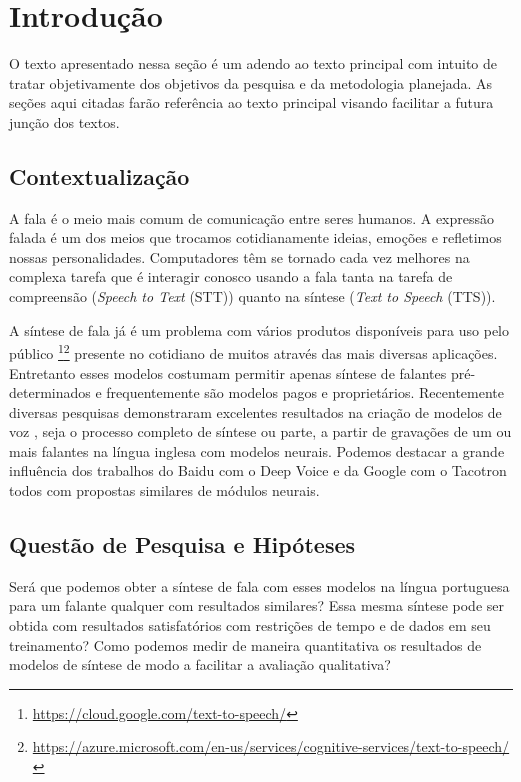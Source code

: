 \documentclass{article}
\begin{document}
\section{Introdução}
O texto apresentado nessa seção é um adendo ao texto principal com intuito de tratar objetivamente dos objetivos da pesquisa e da metodologia planejada. As seções aqui citadas farão referência ao texto principal visando facilitar a futura junção dos textos.
\subsection{Contextualização}
A fala é o meio mais comum de comunicação entre seres humanos\cite{flanang}. 
A expressão falada é um dos meios que trocamos cotidianamente ideias, emoções e refletimos nossas personalidades\cite{Tiwari2012}. 
Computadores têm se tornado cada vez melhores na complexa tarefa que é interagir conosco usando a fala \cite{HCI-voice} tanta na tarefa de compreensão (\emph{Speech to Text} (STT)) quanto na síntese (\emph{Text to Speech} (TTS)). 

A síntese de fala já é um problema com vários produtos disponíveis para uso pelo público \footnote{\url{https://cloud.google.com/text-to-speech/}}\footnote{\url{https://azure.microsoft.com/en-us/services/cognitive-services/text-to-speech/}} presente no cotidiano de muitos através das mais diversas aplicações.
Entretanto esses modelos costumam permitir apenas síntese de falantes pré-determinados e frequentemente são modelos pagos e proprietários. 
Recentemente diversas pesquisas demonstraram excelentes resultados na criação de modelos de voz , seja o processo completo de síntese ou parte, a partir de gravações de um ou mais falantes na língua inglesa com modelos neurais.
Podemos destacar a grande influência dos trabalhos do Baidu com o Deep Voice\cite{deepVoice,deepVoice2,deepvoice3, baiduVoiceClonning} e da Google com o Tacotron \cite{tacotron,tacotron2, wavenet} todos com propostas similares de módulos neurais.

\subsection{Questão de Pesquisa e Hipóteses}
\label{sec:hipoteses}
Será que podemos obter a síntese de fala com esses modelos na língua portuguesa para um falante qualquer com resultados similares?
Essa mesma síntese pode ser obtida com resultados satisfatórios com restrições de tempo e de dados em seu treinamento?
Como podemos medir de maneira quantitativa os resultados de modelos de síntese de modo a facilitar a avaliação qualitativa?
\end{document}
